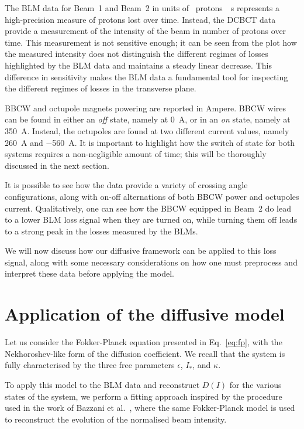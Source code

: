 The BLM data for Beam~1 and Beam~2 in units of \SI{}{protons \per s} represents a high-precision measure of protons lost over time. Instead, the DCBCT data provide a measurement of the intensity of the beam in number of protons over time. This measurement is not sensitive enough; it can be seen from the plot how the measured intensity does not distinguish the different regimes of losses highlighted by the BLM data and maintains a steady linear decrease. This difference in sensitivity makes the BLM data a fundamental tool for inspecting the different regimes of losses in the transverse plane.  

BBCW and octupole magnets powering are reported in Ampere. BBCW wires can be found in either an \textit{off} state, namely at \SI{0}{\ampere}, or in an \textit{on} state, namely at \SI{350}{\ampere}. Instead, the octupoles are found at two different current values, namely \SI{260}{\ampere} and \SI{-560}{\ampere}. It is important to highlight how the switch of state for both systems requires a non-negligible amount of time; this will be thoroughly discussed in the next section.

It is possible to see how the data provide a variety of crossing angle configurations, along with on-off alternations of both BBCW power and octupoles current. Qualitatively, one can see how the BBCW equipped in Beam~2 do lead to a lower BLM loss signal when they are turned on, while turning them off leads to a strong peak in the losses measured by the BLMs.

We will now discuss how our diffusive framework can be applied to this loss signal, along with some necessary considerations on how one must preprocess and interpret these data before applying the model. 

\section{Application of the diffusive model}\label{sec:5:wire-model}

Let us consider the Fokker-Planck equation presented in Eq.~\eqref{eq:fp}, with the Nekhoroshev-like form of the diffusion coefficient. We recall that the system is fully characterised by the three free parameters $\epsilon$, $I_\ast$, and $\kappa$.

To apply this model to the BLM data and reconstruct $D(I)$ for the various states of the system, we perform a fitting approach inspired by the procedure used in the work of Bazzani et al.~\cite{bazzani2020diffusion}, where the same Fokker-Planck model is used to reconstruct the evolution of the normalised beam intensity.


